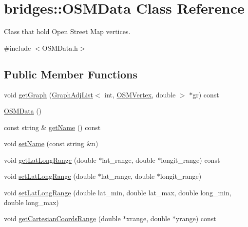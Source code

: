 \hypertarget{classbridges_1_1_o_s_m_data}{}\section{bridges\+:\+:O\+S\+M\+Data Class Reference}
\label{classbridges_1_1_o_s_m_data}


Class that hold Open Street Map vertices.  




{\ttfamily \#include $<$O\+S\+M\+Data.\+h$>$}

\subsection*{Public Member Functions}
\begin{DoxyCompactItemize}
\item 
void \mbox{\hyperlink{classbridges_1_1_o_s_m_data_a3f4f59ddcfb8d01e737106a3e48a1b52}{get\+Graph}} (\mbox{\hyperlink{classbridges_1_1_graph_adj_list}{Graph\+Adj\+List}}$<$ int, \mbox{\hyperlink{classbridges_1_1_o_s_m_vertex}{O\+S\+M\+Vertex}}, double $>$ $\ast$gr) const
\item 
\mbox{\hyperlink{classbridges_1_1_o_s_m_data_a8abc19a052659621f74d7cbe354f90e9}{O\+S\+M\+Data}} ()
\item 
const string \& \mbox{\hyperlink{classbridges_1_1_o_s_m_data_a420a29bced0d8c04bc5afcb9adf0621a}{get\+Name}} () const
\item 
void \mbox{\hyperlink{classbridges_1_1_o_s_m_data_afd9750f005c1cee41f54b93de3a9c241}{set\+Name}} (const string \&n)
\item 
void \mbox{\hyperlink{classbridges_1_1_o_s_m_data_ad342159a5b7647238fda36ae91d0836e}{get\+Lat\+Long\+Range}} (double $\ast$lat\+\_\+range, double $\ast$longit\+\_\+range) const
\item 
void \mbox{\hyperlink{classbridges_1_1_o_s_m_data_a75197b6c3de0ada8c69aae3051368d00}{set\+Lat\+Long\+Range}} (double $\ast$lat\+\_\+range, double $\ast$longit\+\_\+range)
\item 
void \mbox{\hyperlink{classbridges_1_1_o_s_m_data_a4ddb01d0735da5e21fd8e33d1d5203ad}{set\+Lat\+Long\+Range}} (double lat\+\_\+min, double lat\+\_\+max, double long\+\_\+min, double long\+\_\+max)
\item 
void \mbox{\hyperlink{classbridges_1_1_o_s_m_data_ade3af326972e31ce991798e800fbbd5b}{get\+Cartesian\+Coords\+Range}} (double $\ast$xrange, double $\ast$yrange) const
\item 

\end{DoxyCompactItemize}
